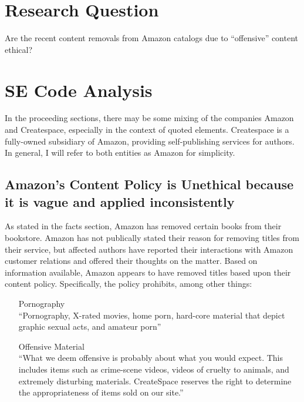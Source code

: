 \documentclass[10pt]{article}
\begin{document}
\begin{multicols}{2}
\begin{itemize}
\end{itemize}

\section{Research Question}
Are the recent content removals from Amazon catalogs due to ``offensive'' content ethical?

\section{SE Code Analysis}

In the proceeding sections, there may be some mixing of the companies Amazon and Createspace, especially in the context of quoted elements.  Createspace is a fully-owned subsidiary of Amazon, providing self-publishing services for authors.  In general, I will refer to both entities as Amazon for simplicity.

\subsection{Amazon's Content Policy is Unethical because it is vague and applied inconsistently}

As stated in the facts section, Amazon has removed certain books from their bookstore.  Amazon has not publically stated their reason for removing titles from their service, but affected authors have reported their interactions with Amazon customer relations and offered their thoughts on the matter.  Based on information available, Amazon appears to have removed titles based upon their content policy.  Specifically, the policy prohibits, among other things:

\begin{itemize}
\item[Pornography] \hfill \\
      ``Pornography, X-rated movies, home porn, hard-core material that depict graphic sexual acts, and amateur porn''
\item[Offensive Material] \hfill \\
      ``What we deem offensive is probably about what you would expect. This includes items such as crime-scene videos, videos of cruelty to animals, and extremely disturbing materials. CreateSpace reserves the right to determine the appropriateness of items sold on our site.''

\end{itemize}


\end{multicols}
\end{document}
